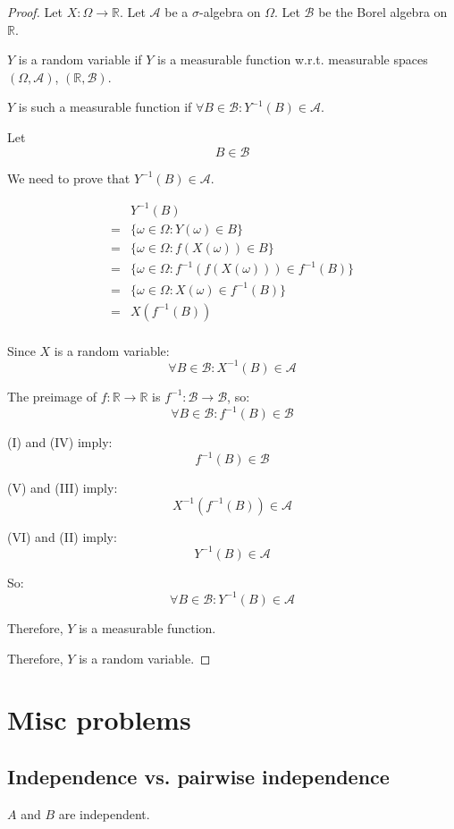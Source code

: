 \documentclass{article}
\begin{document}
\begin{proof}
Let \(X:\Omega\to \mathbb{R}\).
Let \(\mathcal{A}\) be a \(\sigma\)-algebra on \(\Omega\).
Let \(\mathcal{B}\) be the Borel algebra on \(\mathbb{R}\).

\(Y\) is a random variable if \(Y\) is a measurable function w.r.t. measurable
spaces \((\Omega, \mathcal{A})\), \((\mathbb{R}, \mathcal{B})\).

\(Y\) is such a measurable function if \(\forall B\in \mathcal{B}: Y^{-1}(B)\in \mathcal{A}\).

Let
\[B\in \mathcal{B}\tag{I}\]

We need to prove that \(Y^{-1}(B)\in \mathcal{A}\).

\begin{align*}
	 & Y^{-1}(B) \\
	=& \{\omega\in \Omega: Y(\omega)\in B\} \\
	=& \{\omega\in \Omega: f(X(\omega))\in B\} \\
	=& \{\omega\in \Omega: f^{-1}(f(X(\omega)))\in f^{-1}(B)\} \\
	=& \{\omega\in \Omega: X(\omega)\in f^{-1}(B)\} \\
	=& X(f^{-1}(B)) \tag{II} \\
\end{align*}

Since \(X\) is a random variable:
\[\forall B\in \mathcal{B}: X^{-1}(B)\in \mathcal{A} \tag{III}\]

The preimage of \(f:\mathbb{R}\to\mathbb{R}\) is \(f^{-1}: \mathcal{B} \to\mathcal{B}\), so:
\[\forall B \in \mathcal{B}: f^{-1}(B)\in \mathcal{B} \tag{IV}\]

(I) and (IV) imply:
\[f^{-1}(B) \in \mathcal{B} \tag{V}\]

(V) and (III) imply:
\[X^{-1}(f^{-1}(B))\in \mathcal{A}\tag{VI}\]

(VI) and (II) imply:
\[Y^{-1}(B) \in \mathcal{A}\]

So:
\[\forall B\in \mathcal{B}:Y^{-1}(B) \in \mathcal{A}\]

Therefore, \(Y\) is a measurable function.

Therefore, \(Y\) is a random variable.
\end{proof}

\section{Misc problems}
\subsection{Independence vs. pairwise independence}
\(A\) and \(B\) are independent.
\end{document}
